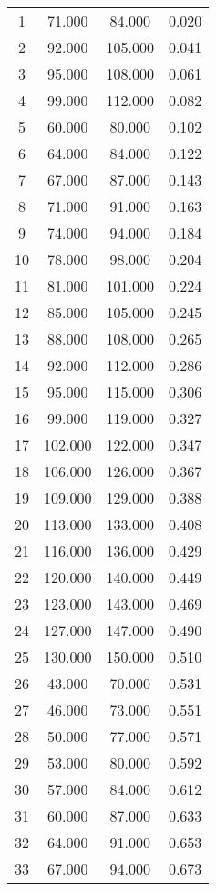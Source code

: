 % 
\begin{tabular}{cccc}
  \hline
  \hline
1 & 71.000 & 84.000 & 0.020 \\ 
  2 & 92.000 & 105.000 & 0.041 \\ 
  3 & 95.000 & 108.000 & 0.061 \\ 
  4 & 99.000 & 112.000 & 0.082 \\ 
  5 & 60.000 & 80.000 & 0.102 \\ 
  6 & 64.000 & 84.000 & 0.122 \\ 
  7 & 67.000 & 87.000 & 0.143 \\ 
  8 & 71.000 & 91.000 & 0.163 \\ 
  9 & 74.000 & 94.000 & 0.184 \\ 
  10 & 78.000 & 98.000 & 0.204 \\ 
  11 & 81.000 & 101.000 & 0.224 \\ 
  12 & 85.000 & 105.000 & 0.245 \\ 
  13 & 88.000 & 108.000 & 0.265 \\ 
  14 & 92.000 & 112.000 & 0.286 \\ 
  15 & 95.000 & 115.000 & 0.306 \\ 
  16 & 99.000 & 119.000 & 0.327 \\ 
  17 & 102.000 & 122.000 & 0.347 \\ 
  18 & 106.000 & 126.000 & 0.367 \\ 
  19 & 109.000 & 129.000 & 0.388 \\ 
  20 & 113.000 & 133.000 & 0.408 \\ 
  21 & 116.000 & 136.000 & 0.429 \\ 
  22 & 120.000 & 140.000 & 0.449 \\ 
  23 & 123.000 & 143.000 & 0.469 \\ 
  24 & 127.000 & 147.000 & 0.490 \\ 
  25 & 130.000 & 150.000 & 0.510 \\ 
  26 & 43.000 & 70.000 & 0.531 \\ 
  27 & 46.000 & 73.000 & 0.551 \\ 
  28 & 50.000 & 77.000 & 0.571 \\ 
  29 & 53.000 & 80.000 & 0.592 \\ 
  30 & 57.000 & 84.000 & 0.612 \\ 
  31 & 60.000 & 87.000 & 0.633 \\ 
  32 & 64.000 & 91.000 & 0.653 \\ 
  33 & 67.000 & 94.000 & 0.673 \\ 

\end{tabular}

